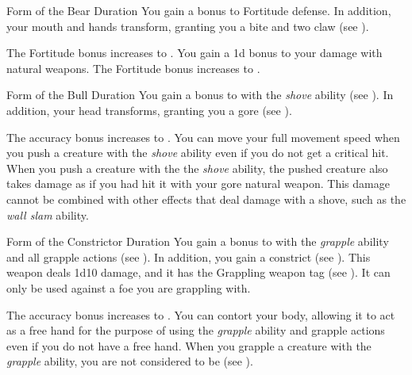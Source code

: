         {
            \begin{durationability}{Form of the Bear}
                Duration
                \rankline
                You gain a  bonus to Fortitude defense.
                In addition, your mouth and hands transform, granting you a bite and two claw  (see ).

                \rankline
                 The Fortitude bonus increases to .
                 You gain a \plus1d bonus to your damage with natural weapons.
                 The Fortitude bonus increases to .
            \end{durationability}

            \begin{durationability}{Form of the Bull}
                Duration
                \rankline
                You gain a  bonus to  with the \textit{shove} ability (see ).
                In addition, your head transforms, granting you a gore  (see ).

                \rankline
                 The accuracy bonus increases to .
                 You can move your full movement speed when you push a creature with the \textit{shove} ability even if you do not get a critical hit.
                 When you push a creature with the the \textit{shove} ability, the pushed creature also takes damage as if you had hit it with your gore natural weapon.
                This damage cannot be combined with other effects that deal damage with a shove, such as the \textit{wall slam} ability.
            \end{durationability}

            \begin{durationability}{Form of the Constrictor}
                Duration
                \rankline
                You gain a  bonus to  with the \textit{grapple} ability and all grapple actions (see ).
                In addition, you gain a constrict  (see ).
                This weapon deals 1d10 damage, and it has the Grappling weapon tag (see ).
                It can only be used against a foe you are grappling with.

                \rankline
                 The accuracy bonus increases to .
                 You can contort your body, allowing it to act as a free hand for the purpose of using the \textit{grapple} ability and grapple actions even if you do not have a free hand.
                 When you grapple a creature with the \textit{grapple} ability, you are not considered to be \grappled (see ).
            \end{durationability}

}
